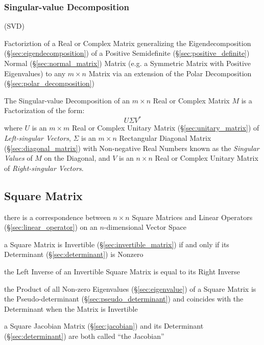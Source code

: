 \subsubsection{Singular-value Decomposition}\label{sec:svd}

(SVD)

Factoriztion of a Real or Complex Matrix generalizing the Eigendecomposition
(\S\ref{sec:eigendecomposition}) of a Positive Semidefinite
(\S\ref{sec:positive_definite}) Normal (\S\ref{sec:normal_matrix}) Matrix (e.g.
a Symmetric Matrix with Positive Eigenvalues) to any $m \times n$ Matrix via an
extension of the Polar Decomposition (\S\ref{sec:polar_decomposition})

The Singular-value Decomposition of an $m \times n$ Real or Complex Matrix $M$
is a Factorization of the form:
\[
  U \Sigma V^*
\]
where $U$ is an $m \times m$ Real or Complex Unitary Matrix
(\S\ref{sec:unitary_matrix}) of \emph{Left-singular Vectors}, $\Sigma$ is an $m
\times n$ Rectangular Diagonal Matrix (\S\ref{sec:diagonal_matrix}) with
Non-negative Real Numbers known as the \emph{Singular Values} of $M$ on the
Diagonal, and $V$ is an $n \times n$ Real or Complex Unitary Matrix of
\emph{Right-singular Vectors}.



\subsection{Square Matrix}\label{sec:square_matrix}

there is a correspondence between $n\times{n}$ Square Matrices and Linear
Operators (\S\ref{sec:linear_operator}) on an $n$-dimensional Vector Space

a Square Matrix is Invertible (\S\ref{sec:invertible_matrix}) if and only if
its Determinant (\S\ref{sec:determinant}) is Nonzero

the Left Inverse of an Invertible Square Matrix is equal to its Right Inverse

the Product of all Non-zero Eigenvalues (\S\ref{sec:eigenvalue}) of a Square
Matrix is the Pseudo-determinant (\S\ref{sec:pseudo_determinant}) and coincides
with the Determinant when the Matrix is Invertible

a Square Jacobian Matrix (\S\ref{sec:jacobian}) and its Determinant
(\S\ref{sec:determinant}) are both called ``the Jacobian''

